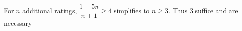 For $n$ additional ratings, $\dfrac{1+5n}{n+1}\ge4$ simplifies to $n\ge3$. Thus $\boxed3$ suffice and are necessary.
